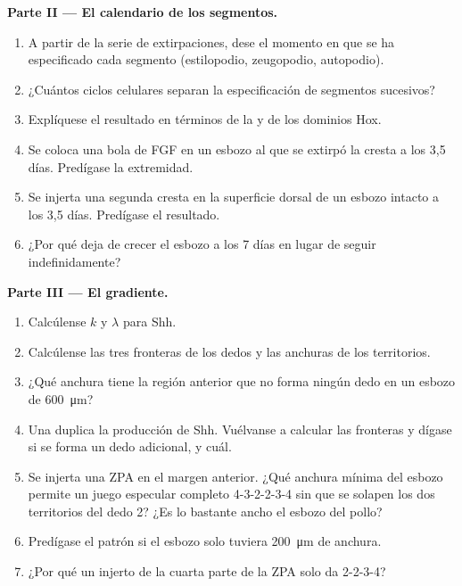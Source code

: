 \begin{problem}
\medskip
\noindent\textbf{Parte II --- El calendario de los segmentos.}
\begin{enumerate}[resume]
  \item A partir de la serie de extirpaciones, dese el momento en que se
        ha especificado cada segmento (estilopodio, zeugopodio,
        autopodio).
  \item ¿Cuántos ciclos celulares separan la especificación de segmentos
        sucesivos?
  \item Explíquese el resultado en términos de la  y de
        los dominios Hox.
  \item Se coloca una bola de FGF en un esbozo al que se extirpó la cresta
        a los 3,5 días. Predígase la extremidad.
  \item Se injerta una segunda cresta en la superficie dorsal de un esbozo
        intacto a los 3,5 días. Predígase el resultado.
  \item ¿Por qué deja de crecer el esbozo a los 7 días en lugar de seguir
        indefinidamente?
\end{enumerate}

\medskip
\noindent\textbf{Parte III --- El gradiente.}
\begin{enumerate}[resume]
  \item Calcúlense $k$ y $\lambda$ para Shh.
  \item Calcúlense las tres fronteras de los dedos y las anchuras de los
        territorios.
  \item ¿Qué anchura tiene la región anterior que no forma ningún dedo en
        un esbozo de \qty{600}{\micro m}?
  \item Una  duplica la producción de Shh. Vuélvanse a calcular
        las fronteras y dígase si se forma un dedo adicional, y cuál.
  \item Se injerta una ZPA en el margen anterior. ¿Qué anchura mínima del
        esbozo permite un juego especular completo 4-3-2-2-3-4 sin que se
        solapen los dos territorios del dedo 2? ¿Es lo bastante ancho el
        esbozo del pollo?
  \item Predígase el patrón si el esbozo solo tuviera \qty{200}{\micro m}
        de anchura.
  \item ¿Por qué un injerto de la cuarta parte de la ZPA solo da 2-2-3-4?
\end{enumerate}


\end{problem}
